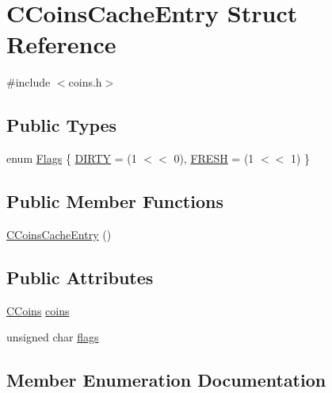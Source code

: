 \hypertarget{struct_c_coins_cache_entry}{}\section{C\+Coins\+Cache\+Entry Struct Reference}
\label{struct_c_coins_cache_entry}


{\ttfamily \#include $<$coins.\+h$>$}

\subsection*{Public Types}
\begin{DoxyCompactItemize}
\item 
enum \mbox{\hyperlink{struct_c_coins_cache_entry_a1d5ac74da0f6ff5ab056e47ce79753c7}{Flags}} \{ \mbox{\hyperlink{struct_c_coins_cache_entry_a1d5ac74da0f6ff5ab056e47ce79753c7ac8cbd1b21d937e8618f9fecdf2c7223e}{D\+I\+R\+TY}} = (1 $<$$<$ 0), 
\mbox{\hyperlink{struct_c_coins_cache_entry_a1d5ac74da0f6ff5ab056e47ce79753c7aae43958b088ff7b6e4f0daaafff00816}{F\+R\+E\+SH}} = (1 $<$$<$ 1)
 \}
\end{DoxyCompactItemize}
\subsection*{Public Member Functions}
\begin{DoxyCompactItemize}
\item 
\mbox{\hyperlink{struct_c_coins_cache_entry_ad241b5b23552ba45c0372b71f73d0f25}{C\+Coins\+Cache\+Entry}} ()
\end{DoxyCompactItemize}
\subsection*{Public Attributes}
\begin{DoxyCompactItemize}
\item 
\mbox{\hyperlink{class_c_coins}{C\+Coins}} \mbox{\hyperlink{struct_c_coins_cache_entry_a343585f1fcb810f9c21fc25ae42a1eba}{coins}}
\item 
unsigned char \mbox{\hyperlink{struct_c_coins_cache_entry_a05225c349f51777385e3a1c9b0eeaaed}{flags}}
\end{DoxyCompactItemize}


\subsection{Member Enumeration Documentation}
\mbox{\label{struct_c_coins_cache_entry_a1d5ac74da0f6ff5ab056e47ce79753c7}} 
